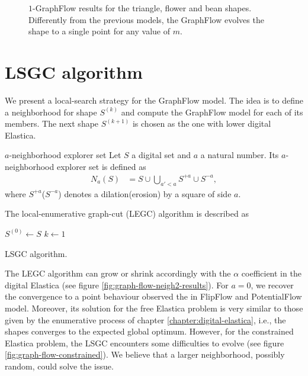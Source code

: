 \begin{figure}
\begin{tabular}{cccc}
\end{tabular}
\caption{$1$-GraphFlow results for the triangle, flower and bean shapes. Differently from the previous models, the GraphFlow evolves the shape to a single point for any value of $m$.}
\label{fig:graph-flow-neigh0-results}
\end{figure}

\section{LSGC algorithm}
	We present a local-search strategy for the GraphFlow model. The idea is to define a neighborhood for shape $S^{(k)}$ and compute the GraphFlow model for each of its members. The next shape $S^{(k+1)}$ is chosen as the one with lower digital Elastica.

\begin{definition}{$a$-neighborhood explorer set}
	Let $S$ a digital set and $a$ a natural number. Its $a$-neighborhood explorer set is defined as
	\begin{align*}
		N_a(S) &= S \cup \bigcup_{a' < a}{S^{+a} \cup S^{-a}},
	\end{align*}
	where $S^{+a}$($S^{-a}$) denotes a dilation(erosion) by a square of side $a$.
\end{definition}

The local-enumerative graph-cut (LEGC) algorithm is described as


\begin{algorithm}
 
 \BlankLine
 $S^{(0)} \longleftarrow S$\;
 $k \longleftarrow 1$\;
 \caption{LSGC algorithm.}
 \label{alg:legc-algorithm}  
\end{algorithm}

The LEGC algorithm can grow or shrink accordingly with the $\alpha$ coefficient in the digital Elastica (see figure \ref{fig:graph-flow-neigh2-results}). For $a=0$, we recover the convergence to a point behaviour observed the in FlipFlow and PotentialFlow model. Moreover, its solution for the free Elastica problem is very similar to those given by the enumerative process of chapter \ref{chapter:digital-elastica}, i.e., the shapes converges to the expected global optimum. However, for the constrained Elastica problem, the LSGC encounters some difficulties to evolve (see figure \ref{fig:graph-flow-constrained}). We believe that a larger neighborhood, possibly random, could solve the issue.

